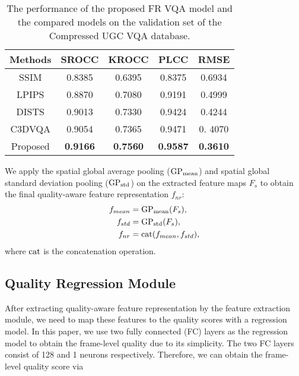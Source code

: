 \documentclass{article}
\begin{document}
\begin{table}
	\small
\centering
	\renewcommand{\arraystretch}{1.15}
	\caption{The performance of the proposed FR VQA model and the compared models on the validation set of the Compressed UGC VQA database.}
	\label{FR_Compressed}
\begin{tabular}{c|cccc}
		\toprule[.15em]
		
		Methods & SROCC & KROCC & PLCC & RMSE   \\
		\hline
		
		SSIM \cite{wang2004image}    &0.8385 &0.6395  & 0.8375  &0.6934  \\
		
LPIPS \cite{zhang2018unreasonable} &0.8870  	&0.7080 &0.9191 &0.4999\\
		DISTS\cite{ding2020image} &0.9013 &0.7330 &0.9424 &0.4244 \\
		C3DVQA \cite{xu2020c3dvqa} & 0.9054 	&0.7365& 0.9471&  0. 4070 \\
		Proposed    & \textbf{0.9166} 	&\textbf{ 0.7560} 	&\textbf{0.9587} 	&\textbf{0.3610} \\
		
		\bottomrule[.15em]
		
	\end{tabular}
	
	
	


\end{table}




We apply the spatial global average pooling ($ \rm GP_{mean}$) and spatial global standard deviation pooling ($ \rm GP_{std}$) on the extracted feature maps $F_{s}$ to obtain the final quality-aware feature representation $f_{nr}$:
\begin{equation}
\begin{aligned}
f_{mean} &= { \rm GP_{mean}}(F_s), \\
f_{std} &= { \rm GP_{std}}(F_s), \\
f_{nr} &= { \rm cat}(f_{mean}, f_{std}), \\
\end{aligned}
\end{equation}
where $ \rm cat$ is the concatenation operation.
\subsection{Quality Regression Module}
After extracting quality-aware feature representation by the feature extraction module, we need to map these features to the quality scores with a regression model. In this paper, we use two fully connected (FC) layers as the regression model to obtain the frame-level quality due to its simplicity. The two FC layers consist of 128 and 1 neurons respectively. Therefore, we can obtain the frame-level quality score via
\end{document}
